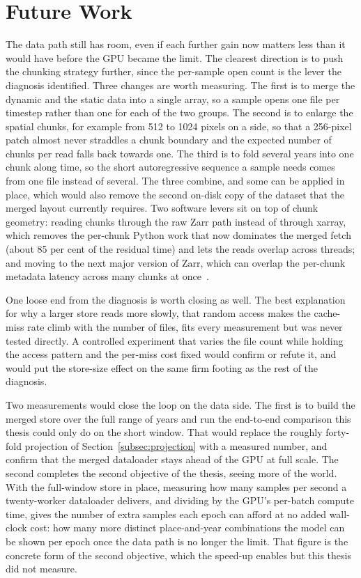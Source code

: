 \documentclass[12pt,a4paper]{article}
\begin{document}
\section{Future Work}

The data path still has room, even if each further gain now matters less than it would have
before the GPU became the limit. The clearest direction is to push the chunking strategy
further, since the per-sample open count is the lever the diagnosis identified. Three changes
are worth measuring. The first is to merge the dynamic and the static data into a single array,
so a sample opens one file per timestep rather than one for each of the two groups. The second
is to enlarge the spatial chunks, for example from 512 to 1024 pixels on a side, so that a
256-pixel patch almost never straddles a chunk boundary and the expected number of chunks per
read falls back towards one. The third is to fold several years into one chunk along time, so
the short autoregressive sequence a sample needs comes from one file instead of several. The
three combine, and some can be applied in place, which would also remove the second on-disk
copy of the dataset that the merged layout currently requires. Two software levers sit on top
of chunk geometry: reading chunks through the raw Zarr path instead of through xarray, which
removes the per-chunk Python work that now dominates the merged fetch (about 85 per cent of the
residual time) and lets the reads overlap across threads; and moving to the next major version
of Zarr, which can overlap the per-chunk metadata latency across many chunks at
once~\cite{earthmover_xarray_zarr3}.

One loose end from the diagnosis is worth closing as well. The best explanation for why a
larger store reads more slowly, that random access makes the cache-miss rate climb with the
number of files, fits every measurement but was never tested directly. A controlled experiment
that varies the file count while holding the access pattern and the per-miss cost fixed would
confirm or refute it, and would put the store-size effect on the same firm footing as the rest
of the diagnosis.

Two measurements would close the loop on the data side. The first is to build the merged store
over the full range of years and run the end-to-end comparison this thesis could only do on the
short window. That would replace the roughly forty-fold projection of
Section~\ref{subsec:projection} with a measured number, and confirm that the merged dataloader
stays ahead of the GPU at full scale.
The second completes the second objective of the thesis, seeing more of the world. With the
full-window store in place, measuring how many samples per second a twenty-worker dataloader
delivers, and dividing by the GPU's per-batch compute time, gives the number of extra samples
each epoch can afford at no added wall-clock cost: how many more distinct place-and-year
combinations the model can be shown per epoch once the data path is no longer the limit. That
figure is the concrete form of the second objective, which the speed-up enables but this thesis
did not measure.
\end{document}
